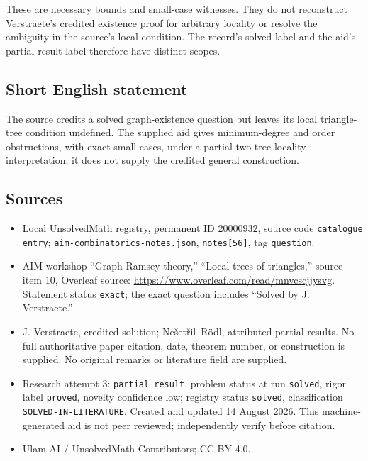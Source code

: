 \documentclass[11pt]{article}
\begin{document}
These are necessary bounds and small-case witnesses. They do not reconstruct Verstraete's credited existence proof for arbitrary locality or resolve the ambiguity in the source's local condition. The record's solved label and the aid's partial-result label therefore have distinct scopes.
\subsection{Short English statement}
The source credits a solved graph-existence question but leaves its local triangle-tree condition undefined. The supplied aid gives minimum-degree and order obstructions, with exact small cases, under a partial-two-tree locality interpretation; it does not supply the credited general construction.
\subsection{Sources}
\begin{itemize}
\item Local UnsolvedMath registry, permanent ID \(20000932\), source code \texttt{catalogue entry}; \texttt{aim-combinatorics-notes.json}, \texttt{notes[56]}, tag \texttt{question}.
\item AIM workshop ``Graph Ramsey theory,'' ``Local trees of triangles,'' source item 10, Overleaf source: \url{https://www.overleaf.com/read/mnvcscjjysvg}. Statement status \texttt{exact}; the exact question includes ``Solved by J. Verstraete.''
\item J. Verstraete, credited solution; Ne\v{s}et\v{r}il--R\"odl, attributed partial results. No full authoritative paper citation, date, theorem number, or construction is supplied. No original remarks or literature field are supplied.
\item Research attempt 3: \texttt{partial\_result}, problem status at run \texttt{solved}, rigor label \texttt{proved}, novelty confidence low; registry status \texttt{solved}, classification \texttt{SOLVED-IN-LITERATURE}. Created and updated 14 August 2026. This machine-generated aid is not peer reviewed; independently verify before citation.
\item Ulam AI / UnsolvedMath Contributors; CC BY 4.0.
\end{itemize}
\end{document}
